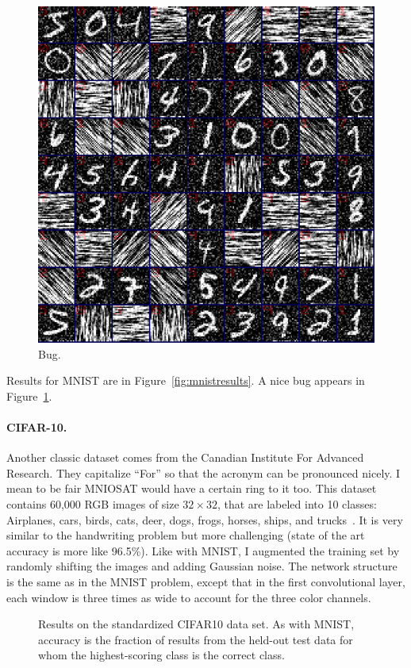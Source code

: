 \documentclass[twocolumn]{article}
\begin{document}
\begin{figure}[htp]
  \includegraphics[width=0.9 \linewidth]{mnist-bug}
  \caption{
    Bug.
  } \label{fig:mnistbug}
\end{figure}

Results for MNIST are in Figure~\ref{fig:mnistresults}.
A nice bug appears in Figure~\ref{fig:mnistbug}.

\paragraph{CIFAR-10.}
Another classic dataset comes from the Canadian Institute For Advanced
Research. They capitalize ``For'' so that the acronym can be
pronounced nicely. I mean to be fair MNIOSAT would have a certain ring
to it too. This dataset contains 60,000 RGB images of size $32 \times 32$, that
are labeled into 10 classes: Airplanes, cars, birds, cats, deer, dogs,
frogs, horses, ships, and trucks~\cite{krizhevsky2009learning}. It is
very similar to the handwriting problem but more challenging (state of
the art accuracy is more like 96.5\%). Like with MNIST, I augmented the
training set by randomly shifting the images and adding Gaussian
noise. The network structure is the same as in the MNIST problem,
except that in the first convolutional layer, each window is three
times as wide to account for the three color channels.

\begin{figure}[htp]
  
  \caption{
    Results on the standardized CIFAR10 data set. As with MNIST,
    accuracy is the fraction of results from the held-out test
    data for whom the highest-scoring class is the correct class.
  } \label{fig:cifar10results}
\end{figure}
\end{document}
